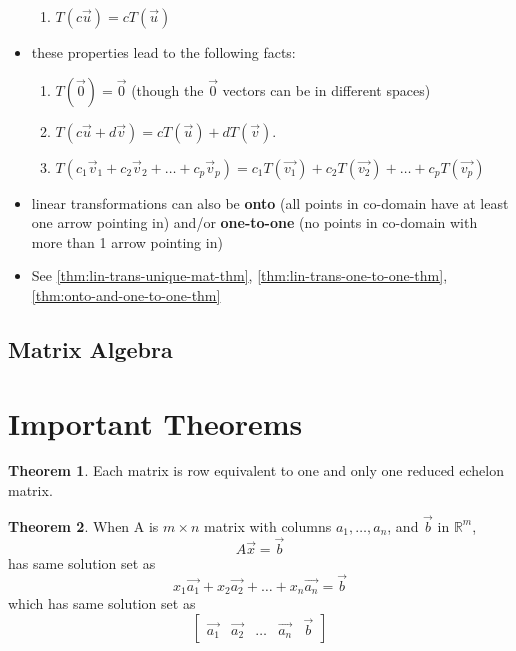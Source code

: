 \documentclass[a4paper,12pt]{article}
\theoremstyle{definition}
\newtheorem{theorem}{Theorem}
\theoremstyle{definition}
\newcommand{\mateq}[3]{#1#2 = #3}
\newcommand{\finiteadd}[3]{#1 + #2 + \ldots + #3}
\newcommand{\lincombo}[4]{\finiteadd{#1_1#2_1}{#1_2#2_2}{#1_#3#2_#4}}
\begin{document}
\begin{itemize}
\begin{enumerate}
			\item $T(c\vec{u}) = cT(\vec{u})$
		\end{enumerate}
		
		\item these properties lead to the following facts:
		\begin{enumerate}
			\item $T(\vec{0}) = \vec{0}$ (though the $\vec{0}$ vectors can be in different spaces)
			
			\item $T(c\vec{u} + d\vec{v}) = cT(\vec{u}) + dT(\vec{v})$.
			
			\item $T(\lincombo{c}{\vec{v}}{p}{p}) = \finiteadd{c_1T(\vec{v_1})}{c_2T(\vec{v_2})}{c_pT(\vec{v_p})}$
		\end{enumerate}
		
		\item linear transformations can also be \textbf{onto} (all points in co-domain have at least one arrow pointing in) and/or \textbf{one-to-one} (no points in co-domain with more than 1 arrow pointing in)
		
		\item See \autoref{thm:lin-trans-unique-mat-thm}, \autoref{thm:lin-trans-one-to-one-thm}, \autoref{thm:onto-and-one-to-one-thm}
	\end{itemize}
	
	\subsection{Matrix Algebra}
	\newpage
	
	\section{Important Theorems}
	\begin{theorem}
		Each matrix is row equivalent to one and only one reduced echelon matrix.
	\end{theorem}
	
	\begin{theorem}
		\label{thm:A-x-b-thm}
		When A is $m \times n$ matrix with columns $a_1,\ldots,a_n$, and $\vec{b}$ in $\mathbb{R}^m$,
		\begin{equation*}
			\mateq{A}{\vec{x}}{\vec{b}}
		\end{equation*}
		has same solution set as
		\begin{equation*}
			x_1\vec{a_1} + x_2\vec{a_2} + \ldots + x_n\vec{a_n} = \vec{b}
		\end{equation*}
		which has same solution set as 
		\begin{equation*}
			\begin{bmatrix}
				\vec{a_1} & \vec{a_2} & \ldots & \vec{a_n} & \vec{b}
			\end{bmatrix}
		\end{equation*}
	\end{theorem}
	
\end{document}
